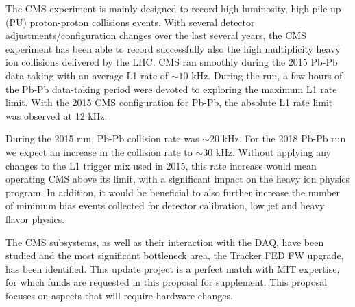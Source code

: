 The CMS experiment is mainly designed to record high luminosity, high pile-up (PU) proton-proton collisions events.  With several detector adjustments/configuration changes over the last several years, the CMS experiment has been able to record successfully also the high multiplicity heavy ion collisions delivered by the LHC. CMS ran smoothly during the 2015 Pb-Pb data-taking with an average L1 rate of $\sim 10$ kHz. During the run, a few hours of the Pb-Pb data-taking period were devoted to exploring the maximum L1 rate limit. With the 2015 CMS configuration for Pb-Pb, the absolute L1 rate limit was observed at 12 kHz. 

During the 2015 run, Pb-Pb collision rate was $\sim 20$ kHz. For the 2018 Pb-Pb run we expect an increase in the collision rate to $\sim 30$ kHz. Without applying any changes to the L1 trigger mix used in 2015, this rate increase would mean operating CMS above its limit, with a significant impact on the heavy ion physics program. In addition, it would be beneficial to also further increase the number of minimum bias events collected for detector calibration, low \pt jet and heavy flavor physics. 

The CMS subsystems, as well as their interaction with the DAQ, have been studied and the most significant bottleneck area, the Tracker FED FW upgrade, has been identified. This update project is a perfect match with MIT expertise, for which funds are requested in this proposal for supplement. This proposal focuses on aspects that will require hardware changes. 

